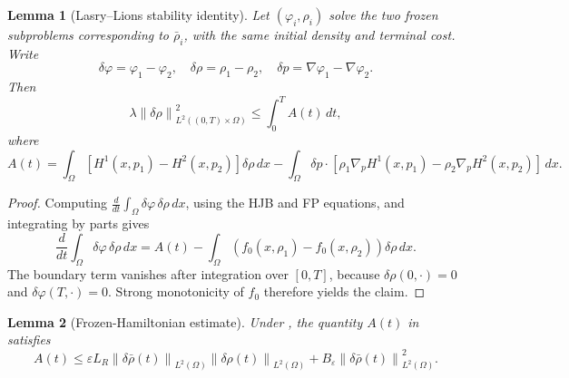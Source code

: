 \documentclass{article}
\newtheorem{lemma}{Lemma}
\newcommand{\eps}{\varepsilon}
\newcommand{\norm}[1]{\left\lVert #1 \right\rVert}
\begin{document}
\begin{lemma}[Lasry--Lions stability identity]
\label{lem:ll_identity}
Let \((\varphi_i,\rho_i)\) solve the two frozen subproblems corresponding to
\(\bar\rho_i\), with the same initial density and terminal cost.  Write
\[
\delta\varphi=\varphi_1-\varphi_2,\quad
\delta\rho=\rho_1-\rho_2,\quad
\delta p=\nabla\varphi_1-\nabla\varphi_2.
\]
Then
\[
\lambda\norm{\delta\rho}_{L^2((0,T)\times\Omega)}^2
\leq \int_0^T A(t)\,dt ,
\]
where
\[
A(t)=\int_\Omega [H^1(x,p_1)-H^2(x,p_2)]\delta\rho\,dx
-\int_\Omega \delta p\cdot[
\rho_1\nabla_pH^1(x,p_1)-\rho_2\nabla_pH^2(x,p_2)]\,dx .
\]
\end{lemma}

\begin{proof}
Computing \(\frac{d}{dt}\int_\Omega \delta\varphi\,\delta\rho\,dx\), using the
HJB and FP equations, and integrating by parts gives
\[
\frac{d}{dt}\int_\Omega \delta\varphi\,\delta\rho\,dx
= A(t)-\int_\Omega (f_0(x,\rho_1)-f_0(x,\rho_2))\delta\rho\,dx .
\]
The boundary term vanishes after integration over \([0,T]\), because
\(\delta\rho(0,\cdot)=0\) and \(\delta\varphi(T,\cdot)=0\).  Strong
monotonicity of \(f_0\) therefore yields
the claim.
\end{proof}

\begin{lemma}[Frozen-Hamiltonian estimate]
\label{lem:frozen_estimate}
Under , the quantity \(A(t)\) in
 satisfies
\[
  A(t)\leq
  \eps L_R\norm{\delta\bar\rho(t)}_{L^2(\Omega)}
       \norm{\delta\rho(t)}_{L^2(\Omega)}
  +B_\eps\norm{\delta\bar\rho(t)}_{L^2(\Omega)}^2 .
\]
\end{lemma}
\end{document}
